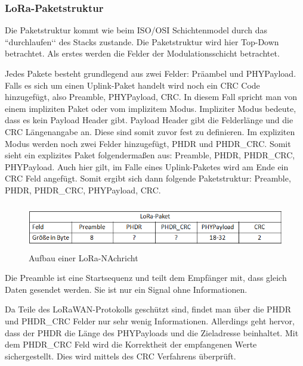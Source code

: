 \documentclass[a4paper, 12pt]{article}
\begin{document}
            \subsubsection{LoRa-Paketstruktur}
                Die Paketstruktur kommt wie beim ISO/OSI Schichtenmodel durch das ``durchlaufen‘‘ des Stacks zustande. 
                Die Paketstruktur wird hier Top-Down betrachtet. Als erstes werden die Felder
                der Modulationsschicht betrachtet.

                Jedes Pakete besteht grundlegend aus zwei Felder: Präambel und PHYPayload. Falls es sich um einen 
                Uplink-Paket handelt wird noch ein CRC Code hinzugefügt, also Preamble, PHYPayload, CRC. 
                In diesem Fall spricht man von einem impliziten Paket oder vom implizitem Modus. Impliziter Modus bedeute, 
                dass es kein Payload Header gibt. Payload Header gibt die Felderlänge und die CRC Längenangabe an. 
                Diese sind somit zuvor fest zu definieren. Im expliziten Modus werden noch zwei Felder hinzugefügt, 
                PHDR und PHDR\_CRC. Somit sieht ein explizites Paket folgendermaßen aus: Preamble, PHDR, PHDR\_CRC, 
                PHYPayload. Auch hier gilt, im Falle
                eines Uplink-Paketes wird am Ende ein CRC Feld angefügt. Somit ergibt sich dann folgende Paketstruktur: 
                Preamble, PHDR, PHDR\_CRC, PHYPayload, CRC.

                \begin{figure}[ht]
                    \centering
                    \includegraphics[height=2cm]{LoRaHeader}
                    \caption{Aufbau einer LoRa-NAchricht}
                \end{figure}

                Die Preamble ist eine Startsequenz und teilt dem Empfänger mit, dass gleich Daten gesendet werden. 
                Sie ist nur ein Signal ohne Informationen.

                Da Teile des LoRaWAN-Protokolls geschützt sind, findet man über die PHDR und PHDR\_CRC Felder nur sehr wenig 
                Informationen. Allerdings geht hervor, dass der PHDR die Länge des PHYPayloads und die Zieladresse 
                beinhaltet.
                Mit dem PHDR\_CRC Feld wird die Korrektheit der empfangenen Werte sichergestellt. Dies wird  
                mittels des CRC Verfahrens überprüft.
                
\end{document}
